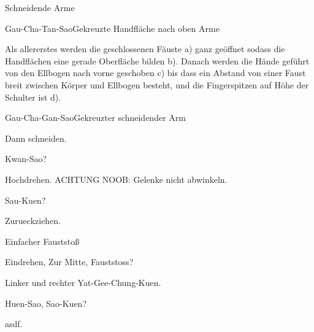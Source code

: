 \begin{WTSatz}{Schneidende Arme}%

	\begin{WTSatzTeil}{Gau-Cha-Tan-Sao}{Gekreuzte Handfl\"ache nach oben Arme}
		
		Als allererstes werden die geschlossenen F\"auste a) ganz ge\"offnet sodass die Handfl\"achen eine gerade Oberfl\"ache bilden b). Danach werden die H\"ande gef\"uhrt von den Ellbogen nach vorne geschoben c) bis dass ein Abstand von einer Faust breit zwischen K\"orper und Ellbogen besteht, und die Fingerspitzen auf H\"ohe der Schulter ist d).
	\end{WTSatzTeil}
	
	\begin{WTSatzTeil}{Gau-Cha-Gan-Sao}{Gekreuzter schneidender Arm}
		
		Dann schneiden.
	\end{WTSatzTeil}
	
	\begin{WTSatzTeil}{Kwan-Sao}{?}
		
		Hochdrehen. ACHTUNG NOOB: Gelenke nicht abwinkeln.
	\end{WTSatzTeil}
	
	\begin{WTSatzTeil}{Sau-Kuen}{?}
		
		Zurueckziehen.
	\end{WTSatzTeil}

\end{WTSatz}


\begin{WTSatz}{Einfacher Fauststo{\ss}}%
	\begin{WTSatzTeil}{Eindrehen, Zur Mitte, Fauststoss}{?}
		
		Linker und rechter Yat-Gee-Chung-Kuen.
	\end{WTSatzTeil}
	\begin{WTSatzTeil}{Huen-Sao, Sao-Kuen}{?}
		
		asdf.
	\end{WTSatzTeil}
\end{WTSatz}

